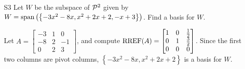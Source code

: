 \begin{problem}{S3}
Let $W$ be the subspace of $\P^2$ given by $W = {\rm span} \left( \left\{  -3x^2-8x, x^2+2x+2, -x+3\right\} \right)$.   Find a basis for $W$.
\end{problem}
\begin{solution}
Let $A= \begin{bmatrix}-3 & 1 & 0 \\ -8 & 2 & -1 \\ 0 & 2 & 3\end{bmatrix}$, and compute $\RREF(A) = \begin{bmatrix} 1 & 0 & \frac{1}{2} \\ 0 & 1 & \frac{3}{2} \\ 0 & 0 & 0 \end{bmatrix}$.
Since the first two columns are pivot columns, $\left\{ -3x^2-8x, x^2+2x+2\right\} $ is a basis for $W$.
\end{solution}


